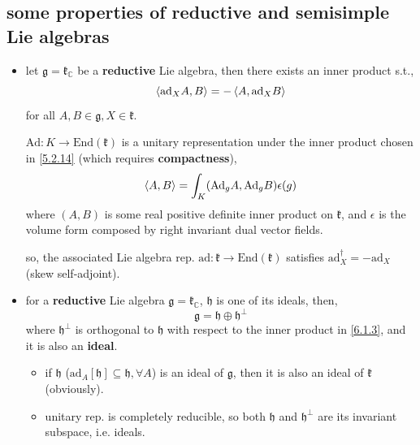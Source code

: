 \subsection{some properties of reductive and semisimple Lie algebras}
\begin{itemize}
	\item let $\mathfrak{g} = \mathfrak{k}_\mathbb{C}$ be a \textbf{reductive} Lie algebra, then there exists an inner product s.t.,
	\begin{equation} \label{6.1.3}
		\braket{\mathrm{ad}_X A, B} = - \braket{A, \mathrm{ad}_X B}
	\end{equation}
	for all $A, B \in \mathfrak{g}, X \in \mathfrak{k}$.
	
	\begin{tcolorbox}[title=proof:]
		$\mathrm{Ad} : K \rightarrow \mathrm{End}(\mathfrak{k})$ is a unitary representation under the inner product chosen in \eqref{5.2.14} (which requires \textbf{compactness}),
		\begin{equation}
			\braket{A, B} = \int_K (\mathrm{Ad}_g A, \mathrm{Ad}_g B) \epsilon(g)
		\end{equation}
		where $(A, B)$ is some real positive definite inner product on $\mathfrak{k}$, and $\epsilon$ is the volume form composed by right invariant dual vector fields.
		
		so, the associated Lie algebra rep. $\mathrm{ad} : \mathfrak{k} \rightarrow \mathrm{End}(\mathfrak{k})$ satisfies $\mathrm{ad}_X^\dag = - \mathrm{ad}_X$ (skew self-adjoint).
	\end{tcolorbox}
	
	\item for a \textbf{reductive} Lie algebra $\mathfrak{g} = \mathfrak{k}_\mathbb{C}$, $\mathfrak{h}$ is one of its ideals, then,
	\begin{equation} \label{6.1.5}
		\mathfrak{g} = \mathfrak{h} \oplus \mathfrak{h}^\perp
	\end{equation}
	where $\mathfrak{h}^\perp$ is orthogonal to $\mathfrak{h}$ with respect to the inner product in \eqref{6.1.3}, and it is also an \textbf{ideal}.
	
	\begin{tcolorbox}[title=proof:]
		\begin{itemize}
			\item if $\mathfrak{h}$ ($\mathrm{ad}_A[\mathfrak{h}] \subseteq \mathfrak{h}, \forall A$) is an ideal of $\mathfrak{g}$, then it is also an ideal of $\mathfrak{k}$ (obviously).
			
			\item unitary rep. is completely reducible, so both $\mathfrak{h}$ and $\mathfrak{h}^\perp$ are its invariant subspace, i.e. ideals.
			

\end{itemize}
\end{tcolorbox}
\end{itemize}
